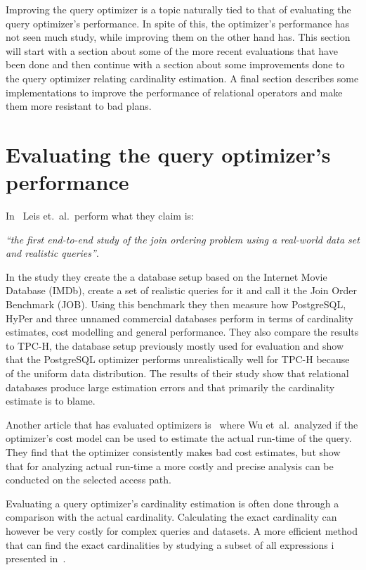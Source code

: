 Improving the query optimizer is a topic naturally tied to that of evaluating the query optimizer's performance. In spite of this, the optimizer's performance has not seen much study, while improving them on the other hand has. This section will start with a section about some of the more recent evaluations that have been done and then continue with a section about some improvements done to the query optimizer relating cardinality estimation. A final section describes some implementations to improve the performance of relational operators and make them more resistant to bad plans.

\section{Evaluating the query optimizer's performance}
In~\cite{leis_2015_how_hgaqor} Leis et.\ al.\ perform what they claim is:

\textit{``the first end-to-end study of the join ordering problem using a real-world data set and realistic queries''}.

In the study they create the a database setup based on the Internet Movie Database (IMDb), create a set of realistic queries for it and call it the Join Order Benchmark (JOB). Using this benchmark they then measure how PostgreSQL, HyPer and three unnamed commercial databases perform in terms of cardinality estimates, cost modelling and general performance. They also compare the results to TPC-H, the database setup previously mostly used for evaluation and show that the PostgreSQL optimizer performs unrealistically well for TPC-H because of the uniform data distribution. The results of their study show that relational databases produce large estimation errors and that primarily the cardinality estimate is to blame.

Another article that has evaluated optimizers is~\cite{wu_2013_predicting_pqetaocmru} where Wu  et\ al.\ analyzed if the optimizer's cost model can be used to estimate the actual run-time of the query. They find that the optimizer consistently makes bad cost estimates, but show that for analyzing actual run-time a more costly and precise analysis can be conducted on the selected access path.

Evaluating a query optimizer's cardinality estimation is often done through a comparison with the actual cardinality. Calculating the exact cardinality can however be very costly for complex queries and datasets. A more efficient method that can find the exact cardinalities by studying a subset of all expressions i presented in~\cite{chaudhuri_2009_exact_ecqofot}.

